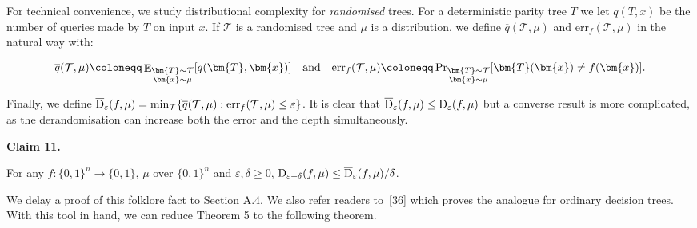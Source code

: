 For technical convenience, we study distributional complexity for \emph{randomised} trees. For a deterministic parity tree $T$ we let $q(T,x)$ be the number of queries made by $T$ on input $x$. If $\mathcal{T}$ is a randomised tree and $\mu$ is a distribution, we define $\overline{q}(\mathcal{T},\mu)$ and $\mathrm{err}_{f}(\mathcal{T},\mu)$ in the natural way with:\par


\[\begin{gathered}
\overline{q}(\mathcal{T},\mu)\coloneqq\mathop{\mathbb{E}}\nolimits_{\begin{subarray}{c}\bm{T}\sim\mathcal{T}\\
\bm{x}\sim\mu\end{subarray}}[q(\bm{T},\bm{x})]\quad\textup{and}\quad\mathrm{err}_{f}(\mathcal{T},\mu)\coloneqq\Pr\nolimits_{\begin{subarray}{c}\bm{T}\sim\mathcal{T}\\
\bm{x}\sim\mu\end{subarray}}[\bm{T}(\bm{x})\neq f(\bm{x})].
\end{gathered}\]


Finally, we define $\overline{{\textup{D}}}_{\varepsilon}(f,\mu)=\min_{\mathcal{T}}\{\overline{q}(\mathcal{T},\mu):\mathrm{err}_{f}(\mathcal{T},\mu)\leq\varepsilon\}$. It is clear that $\overline{{\textup{D}}}_{\varepsilon}(f,\mu)\leq{\textup{D}}_{\varepsilon}(f,\mu)$ but a converse result is more complicated, as the derandomisation can increase both the error and the depth simultaneously.\par





\par\medskip\noindent\textbf{
Claim 11. 
}\par



For any $f\colon\{0,1\}^{n}\to\{0,1\}$, $\mu$ over $\{0,1\}^{n}$ and $\varepsilon,\delta\geq 0$, ${\textup{D}}_{\varepsilon+\delta}(f,\mu)\leq\overline{{\textup{D}}}_{\varepsilon}(f,\mu)/\delta$.\par






We delay a proof of this folklore fact to Section A.4.
We also refer readers to [36] which proves the analogue for ordinary decision trees.
With this tool in hand, we can reduce Theorem 5 to the following theorem.\par



